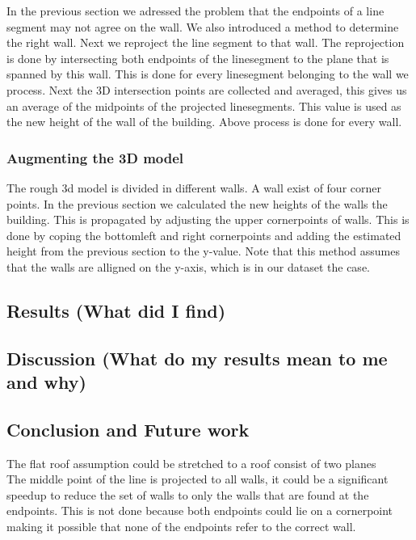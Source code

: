 	In the previous section we adressed the problem that the endpoints of a line segment may not agree on the wall.
	We also introduced a method to determine the right wall.  
	Next we reproject the line segment to that wall.
	The reprojection is done by intersecting both endpoints of the linesegment to the plane that is spanned by this wall.
	This is done for every linesegment belonging to the wall we process. 
	Next the 3D intersection points are collected and averaged, this gives us an average of the midpoints of the projected linesegments.
	This value is used as the new height of the wall of the building.
	Above process is done for every wall.
	

\subsubsection{Augmenting the 3D model} %
	The rough 3d model is divided in different walls. A wall exist of four corner points. In the previous section we calculated the new heights of the walls the building. This is propagated by adjusting the upper cornerpoints of walls.
	This is done by coping the bottomleft and right cornerpoints and adding the estimated height from the previous section to the y-value.
	Note that this method assumes that the walls are alligned on the y-axis, which is in our dataset the case.


\subsection{Results (What did I find)}
\subsection{Discussion (What do my results mean to me and why)}
\subsection{Conclusion and Future work}
The flat roof assumption could be stretched to a roof consist of two planes
\\
The middle point of the line is projected to all walls, it could be a significant speedup to reduce the set of walls to only the walls that are found at the endpoints. This is not done because both endpoints could lie on a cornerpoint making it possible that none of the endpoints refer to the correct wall.


